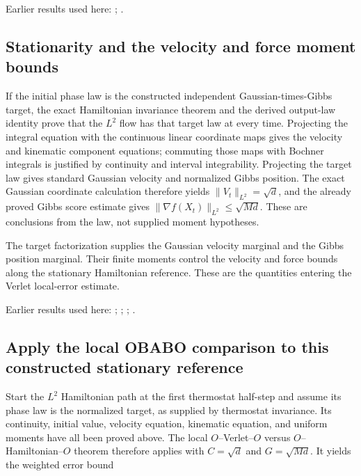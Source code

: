 \documentclass[11pt,a4paper]{report}
\begin{document}
Earlier results used here: \cite[Section~3.13.2]{LangevinLean2026ULASC}; \cite[Section~3.13.5]{LangevinLean2026ULASC}.
\subsection{\texorpdfstring{Stationarity and the velocity and force moment bounds}{Stationarity and the velocity and force moment bounds}}
\label{report-step-KineticLangevin-LpHamiltonianLaw-lean-4}


If the initial phase law is the constructed independent Gaussian-times-Gibbs target, the exact Hamiltonian invariance theorem and the derived output-law identity prove that the \(L^{2}\) flow has that target law at every time. Projecting the integral equation with the continuous linear coordinate maps gives the velocity and kinematic component equations; commuting those maps with Bochner integrals is justified by continuity and interval integrability. Projecting the target law gives standard Gaussian velocity and normalized Gibbs position. The exact Gaussian coordinate calculation therefore yields \(\|V_t\|_{L^2}=\sqrt d\), and the already proved Gibbs score estimate gives \(\|\nabla f(X_t)\|_{L^2}\le\sqrt{Md}\). These are conclusions from the law, not supplied moment hypotheses.



The target factorization supplies the Gaussian velocity marginal and the Gibbs position marginal. Their finite moments control the velocity and force bounds along the stationary Hamiltonian reference. These are the quantities entering the Verlet local-error estimate.



Earlier results used here: \cite[Section~3.13.2]{LangevinLean2026ULASC}; \cite[Section~3.13.5]{LangevinLean2026ULASC}; \cite[Section~3.26.3]{LangevinLean2026ULASC}; \cite[Section~3.28.2]{LangevinLean2026ULASC}.
\subsection{\texorpdfstring{Apply the local OBABO comparison to this constructed stationary reference}{Apply the local OBABO comparison to this constructed stationary reference}}
\label{report-step-KineticLangevin-LpHamiltonianLaw-lean-5}


Start the \(L^{2}\) Hamiltonian path at the first thermostat half-step and assume its phase law is the normalized target, as supplied by thermostat invariance. Its continuity, initial value, velocity equation, kinematic equation, and uniform moments have all been proved above. The local \(O\)–Verlet–\(O\) versus \(O\)–Hamiltonian–\(O\) theorem therefore applies with \(C=\sqrt d\) and \(G=\sqrt{Md}\). It yields the weighted error bound
\end{document}
